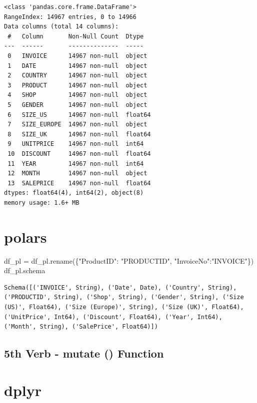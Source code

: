 \documentclass[
  letterpaper,
  DIV=11,
  numbers=noendperiod]{scrreprt}
\newenvironment{Shaded}{\begin{snugshade}}{\end{snugshade}}
\newcommand{\NormalTok}[1]{\textcolor[rgb]{0.00,0.23,0.31}{#1}}
\newcommand{\OperatorTok}[1]{\textcolor[rgb]{0.37,0.37,0.37}{#1}}
\newcommand{\StringTok}[1]{\textcolor[rgb]{0.13,0.47,0.30}{#1}}
\begin{document}
\begin{verbatim}
<class 'pandas.core.frame.DataFrame'>
RangeIndex: 14967 entries, 0 to 14966
Data columns (total 14 columns):
 #   Column       Non-Null Count  Dtype  
---  ------       --------------  -----  
 0   INVOICE      14967 non-null  object 
 1   DATE         14967 non-null  object 
 2   COUNTRY      14967 non-null  object 
 3   PRODUCT      14967 non-null  object 
 4   SHOP         14967 non-null  object 
 5   GENDER       14967 non-null  object 
 6   SIZE_US      14967 non-null  float64
 7   SIZE_EUROPE  14967 non-null  object 
 8   SIZE_UK      14967 non-null  float64
 9   UNITPRICE    14967 non-null  int64  
 10  DISCOUNT     14967 non-null  float64
 11  YEAR         14967 non-null  int64  
 12  MONTH        14967 non-null  object 
 13  SALEPRICE    14967 non-null  float64
dtypes: float64(4), int64(2), object(8)
memory usage: 1.6+ MB
\end{verbatim}

\section{polars}

\begin{Shaded}
\begin{Highlighting}[]
\NormalTok{df\_pl }\OperatorTok{=}\NormalTok{ df\_pl.rename(\{}\StringTok{"ProductID"}\NormalTok{: }\StringTok{"PRODUCTID"}\NormalTok{, }\StringTok{"InvoiceNo"}\NormalTok{:}\StringTok{"INVOICE"}\NormalTok{\})}
\NormalTok{df\_pl.schema}
\end{Highlighting}
\end{Shaded}

\begin{verbatim}
Schema([('INVOICE', String), ('Date', Date), ('Country', String), ('PRODUCTID', String), ('Shop', String), ('Gender', String), ('Size (US)', Float64), ('Size (Europe)', String), ('Size (UK)', Float64), ('UnitPrice', Int64), ('Discount', Float64), ('Year', Int64), ('Month', String), ('SalePrice', Float64)])
\end{verbatim}

\subsection{5th Verb - mutate ()
Function}\label{th-verb---mutate-function}

\section{dplyr}
\end{document}
